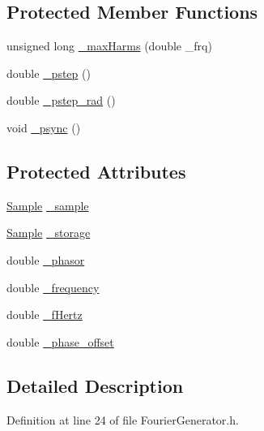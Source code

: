 \subsection*{Protected Member Functions}
\begin{DoxyCompactItemize}
\item 
unsigned long \hyperlink{classSignal_1_1FourierGenerator_abfa6ecda1b94d8ae433e0722e4ec092b}{\+\_\+max\+Harms} (double \+\_\+frq)
\item 
double \hyperlink{classSignal_1_1FourierGenerator_aed4334ef6ec8a47f4fb88a430b65c77b}{\+\_\+pstep} ()
\item 
double \hyperlink{classSignal_1_1FourierGenerator_a01cf1034b4d969b2193205ff94c9a303}{\+\_\+pstep\+\_\+rad} ()
\item 
void \hyperlink{classSignal_1_1FourierGenerator_aea155ae04f7b08050894672bab9d6c52}{\+\_\+psync} ()
\end{DoxyCompactItemize}
\subsection*{Protected Attributes}
\begin{DoxyCompactItemize}
\item 
\hyperlink{classSignal_1_1Sample}{Sample} \hyperlink{classSignal_1_1FourierGenerator_a78c37a66bf33a2fda3c9e92478ad418c}{\+\_\+sample}
\item 
\hyperlink{classSignal_1_1Sample}{Sample} \hyperlink{classSignal_1_1FourierGenerator_af7ad42ccb202fba6c0fb1ec653c5cb36}{\+\_\+storage}
\item 
double \hyperlink{classSignal_1_1FourierGenerator_a72d24f45a30cd143508ce7eb753f4436}{\+\_\+phasor}
\item 
double \hyperlink{classSignal_1_1SignalGenerator_a7f107461333bce68c5dad412db96a8c2}{\+\_\+frequency}
\item 
double \hyperlink{classSignal_1_1SignalGenerator_a85a4702347352bab1c71e0a8df8437d6}{\+\_\+f\+Hertz}
\item 
double \hyperlink{classSignal_1_1SignalGenerator_a6b4444d46747c8517171edbbf4b5588f}{\+\_\+phase\+\_\+offset}
\end{DoxyCompactItemize}


\subsection{Detailed Description}


Definition at line 24 of file Fourier\+Generator.\+h.



